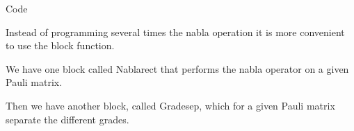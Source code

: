 \documentclass[handout,10pt]{beamer}
\begin{document}
\begin{frame}[shrink=00]{}

\small

\normalsize

\end{frame}

\begin{frame}[shrink=00]{Code}

Instead of programming several times the nabla operation it is more convenient to use the block function.

We have one block called Nablarect that performs the nabla operator on a given Pauli matrix.

Then we have another block, called Gradesep, which for a given Pauli matrix separate the different grades.
\end{frame}

%
%
%
\end{document}
